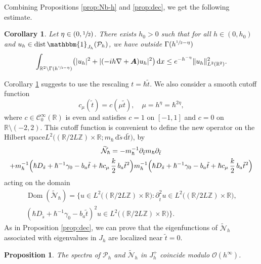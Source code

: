 \documentclass[10pt]{amsart}
\let\sep:
\newcommand{\rd}{\,\mathrm{d}}
\DeclareMathOperator{\dist}{dist}
\DeclareMathOperator{\Dom}{Dom}
\newcommand{\cP}{\mathcal{P}}
\let\mathds\mathbbm
\theoremstyle{plain}
\newtheorem{corollary}[theorem]{Corollary}
\newtheorem{proposition}[theorem]{Proposition}
\theoremstyle{definition}
\newcommand{\A}{\boldsymbol{A}}
\newcommand{\R}{\mathbb{R}}
\newcommand{\Z}{\mathbb{Z}}
\begin{document}
Combining Propositions \ref{prop:Nb-h} and \ref{prop:dec}, we get the following estimate.
\begin{corollary}\label{cor.expdecay}
Let $\eta\in\left(0,\sfrac12\right)$. There exists $h_0>0$ such that for all $h\in(0,h_0)$ and $u_h\in \dist\mathds{1}_{J_h}(\cP_h)$, we have outside $\Gamma(h^{\sfrac12-\eta})$
\begin{equation}\label{eq:dec-norm'}
\int_{\mathbb{R}^2\setminus\Gamma(h^{\sfrac12-\eta})}\bigl(|u_{h}|^2+|(-ih\nabla+\A)u_{h}|^2 \bigr)\rd x\leq e^{-h^{-\eta}}\|u_h\|^2_{L^2(\R^2)}.
\end{equation}
\end{corollary}

Corollary \ref{cor.expdecay} suggests to use the rescaling $t=\hbar \tilde t$. We also consider a smooth cutoff function
\begin{equation}\label{eq:c-delta}
c_\mu(\tilde t)= c(\mu\tilde t),\quad \mu=h^{\eta}=\hbar^{2\eta},
\end{equation}
where $c\in \mathscr{C}^\infty_0(\mathbb R)$ is even and satisfies $c=1$ on $[-1,1]$ and $c=0$ on $\mathbb R\setminus(-2,2)$. This cutoff function is convenient to define the new operator on the Hilbert space\break$ L^2\bigl((\mathbb R/ 2L \mathbb Z)\times\mathbb R;m_\hbar \rd \tilde s \rd \tilde t\bigr)$, by
\begin{multline*}
\widetilde{\mathcal N}_{\hbar}=-m^{-1}_{\hbar}\partial_{\tilde t} m_{\hbar}\partial_{\tilde t}\\
+m^{-1}_{\hbar}\Bigl(\hbar D_{\tilde s}+\hbar^{-1}\gamma_0-b_a\tilde t +\hbar c_\mu \,\frac{k}{2}\,b_a\tilde t^2\Bigr) m^{-1}_{\hbar}\Bigl(\hbar D_{\tilde s}+\hbar^{-1}\gamma_0-b_a\tilde t+\hbar c_\mu\,\frac{k}{2}\,b_a\tilde t^2\Bigr)
\end{multline*}
acting on the domain
\begin{multline*}
\Dom(\widetilde{\mathcal N}_{\hbar})=\bigl\{ u\in L^2\bigl((\mathbb R/ 2L \mathbb Z)\times\mathbb R\bigr)\sep \partial_{\tilde t}^2u\in L^2\bigl((\R/2L\Z)\times\mathbb R\bigr), \\
(\hbar D_{\tilde s}+\hbar^{-1}\gamma_0-b_a\tilde t)^2 u \in L^2\bigl((\mathbb R/ 2L \mathbb Z)\times\mathbb R\bigr) \bigr\}.
\end{multline*}
As in Proposition \ref{prop:dec}, we can prove that the eigenfunctions of $\widetilde{\mathcal{N}}_h$ associated with eigenvalues in $J_h$ are localized near $\tilde t=0$.

\begin{proposition}
\label{prop:BHR2.7}
The spectra of $\cP_h$ and $\widetilde{\mathcal{N}}_h$ in $J^+_h$ coincide modulo $\mathcal{O}(h^{\infty})$.
\end{proposition}
\end{document}

